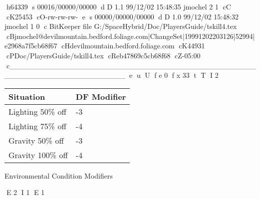 h64339
s 00016/00000/00000
d D 1.1 99/12/02 15:48:35 jmochel 2 1
cC
cK25453
cO-rw-rw-rw-
e
s 00000/00000/00000
d D 1.0 99/12/02 15:48:32 jmochel 1 0
c BitKeeper file G:/SpaceHybrid/Doc/PlayersGuide/tskill4.tex
cBjmochel@devilmountain.bedford.foliage.com|ChangeSet|19991202203126|52994|e2968a7f5cb68f67
cHdevilmountain.bedford.foliage.com
cK44931
cPDoc/PlayersGuide/tskill4.tex
cReb47869c5cb68f68
cZ-05:00
c______________________________________________________________________
e
u
U
f e 0
f x 33
t
T
I 2
\begin{SHTable}[h]
	\begin{tabular}{ll}

	Situation			& DF Modifier	\\
	\hline
	Lighting 50\% off	& -3			\\
	Lighting 75\% off	& -4			\\
	Gravity 50\% off	& -3			\\		   
	Gravity 100\% off	& -4			\\

    \end{tabular}
	\caption{Environmental Condition Modifiers}
\end{SHTable}

E 2
I 1
E 1
